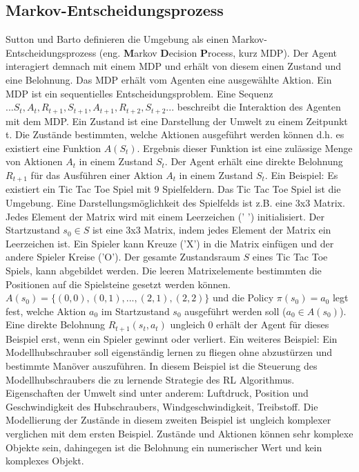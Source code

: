 \documentclass[conference]{IEEEtran}
\begin{document}
\subsection{Markov-Entscheidungsprozess}
Sutton und Barto \cite{sutton_barto_12} definieren die Umgebung als einen Markov-Entscheidungsprozess (eng. \textbf{M}arkov \textbf{D}ecision \textbf{P}rocess, kurz MDP). Der Agent interagiert demnach mit einem MDP und erhält von diesem einen Zustand und eine Belohnung. Das MDP erhält vom Agenten eine ausgewählte Aktion. Ein MDP ist ein sequentielles Entscheidungsproblem. Eine Sequenz $... S_t, A_t, R_{t+1}, S_{t+1}, A_{t+1}, R_{t+2}, S_{t+2} ...$ beschreibt die Interaktion des Agenten mit dem MDP. Ein Zustand ist eine Darstellung der Umwelt zu einem Zeitpunkt t. Die Zustände bestimmten, welche Aktionen ausgeführt werden können d.h. es existiert eine Funktion $A(S_t)$. Ergebnis dieser Funktion ist eine zulässige Menge von Aktionen $A_t$ in einem Zustand $S_t$. Der Agent erhält eine direkte Belohnung $R_{t+1}$ für das Ausführen einer Aktion $A_t$ in einem Zustand $S_t$. Ein Beispiel: Es existiert ein Tic Tac Toe Spiel mit 9 Spielfeldern. Das Tic Tac Toe Spiel ist die Umgebung. Eine Darstellungsmöglichkeit des Spielfelds ist z.B. eine 3x3 Matrix. Jedes Element der Matrix wird mit einem Leerzeichen (' ') initialisiert. Der Startzustand $s_0 \in S$ ist eine 3x3 Matrix, indem jedes Element der Matrix ein Leerzeichen ist. Ein Spieler kann Kreuze ('X') in die Matrix einfügen und der andere Spieler Kreise ('O'). Der gesamte Zustandsraum $S$ eines Tic Tac Toe Spiels, kann abgebildet werden. Die leeren Matrixelemente bestimmten die Positionen auf die Spielsteine gesetzt werden können. $A(s_0) = \{ (0,0), (0,1), ... , (2,1), (2,2)\}$ und die Policy $\pi(s_0) = a_0$ legt fest, welche Aktion $a_0$ im Startzustand $s_0$ ausgeführt werden soll ($a_0 \in A(s_0)$). Eine direkte Belohnung $R_{t+1}(s_t,a_t)$ ungleich $0$ erhält der Agent für dieses Beispiel erst, wenn ein Spieler gewinnt oder verliert. Ein weiteres Beispiel: Ein Modellhubschrauber soll eigenständig lernen zu fliegen ohne abzustürzen und bestimmte Manöver auszuführen. In diesem Beispiel ist die Steuerung des Modellhubschraubers die zu lernende Strategie des RL Algorithmus. Eigenschaften der Umwelt sind unter anderem: Luftdruck, Position und Geschwindigkeit des Hubschraubers, Windgeschwindigkeit, Treibstoff. Die Modellierung der Zustände in diesem zweiten Beispiel ist ungleich komplexer verglichen mit dem ersten Beispiel. Zustände und Aktionen können sehr komplexe Objekte sein, dahingegen ist die Belohnung ein numerischer Wert und kein komplexes Objekt.
\end{document}
